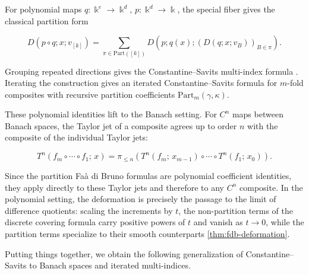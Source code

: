 \documentclass[10pt,a4paper]{article}
\theoremstyle{plain}
\theoremstyle{definition}
\newcommand{\ik}{\Bbbk} %
\newcommand{\1}{\mathbb{1}} %
\newcommand{\Part}{\mathrm{Part}} %
\begin{document}
For polynomial maps \(q: \ik^e \to \ik^d\), \(p: \ik^d \to \ik\), the
special fiber gives the classical partition form \citep{Levy2006}

\[
  D(p \circ q; x; v_{[k]}) = \sum_{\pi \in \Part([k])} D(p; q(x); (D(q; x; v_B))_{B \in \pi}).
\]

Grouping repeated directions gives the Constantine--Savits multi-index
formula \citep{CS1996}. Iterating the construction gives an iterated
Constantine--Savits formula for \(m\)-fold composites with recursive
partition coefficients \(\Part_m(\gamma, \kappa)\).

These polynomial identities lift to the Banach setting. For \(C^n\) maps
between Banach spaces, the Taylor jet of a composite agrees up to order
\(n\) with the composite of the individual Taylor jets:

\[
  T^n(f_m \circ \cdots \circ f_1;\, x) = \pi_{\leq n}(T^n(f_m;\, x_{m-1}) \circ \cdots \circ T^n(f_1;\, x_0)).
\]

Since the partition Faà di Bruno formulas are polynomial coefficient
identities, they apply directly to these Taylor jets and therefore to
any \(C^n\) composite. In the polynomial setting, the deformation is
precisely the passage to the limit of difference quotients: scaling the
increments by \(t\), the non-partition terms of the discrete covering
formula carry positive powers of \(t\) and vanish as \(t \to 0\), while
the partition terms specialize to their smooth counterparts
\ref{thm:fdb-deformation}.

Putting things together, we obtain the following generalization of
Constantine--Savits to Banach spaces and iterated multi-indices.
\end{document}
